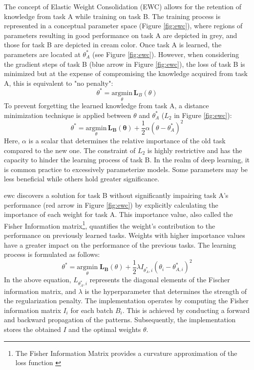 The concept of Elastic Weight Consolidation (EWC) allows for the retention of knowledge from task A while training on task B. The training process is represented in a conceptual parameter space (Figure \ref{fig:ewc}), where regions of parameters resulting in good performance on task A are depicted in grey, and those for task B are depicted in cream color. Once task A is learned, the parameters are located at $\theta_{A}^{*}$ (see Figure \ref{fig:ewc}). However, when considering the gradient steps of task B (blue arrow in Figure \ref{fig:ewc}), the loss of task B is minimized but at the expense of compromising the knowledge acquired from task A, this is equivalent to "no penalty": \[ \theta^* = \underset{\theta}{\mathrm{argmin}} \, \mathbf{L}_B(\theta) \] To prevent forgetting the learned knowledge from task A, a distance minimization technique is applied between $\theta$ and $\theta^{*}_{A}$ ($L_{2}$ in Figure \ref{fig:ewc}): \[ \theta^{*} = \underset{\theta}{\mathrm{argmin}} \, \mathbf{L_B(\theta)} + \frac{1}{2} \alpha ( \theta - \theta_{A}^{*} )^{2} \] Here, $\alpha$ is a scalar that determines the relative importance of the old task compared to the new one. 
The constraint of $L_{2}$ is highly restrictive and has the capacity to hinder the learning process of task B. In the realm of deep learning, it is common practice to excessively parameterize models. Some parameters may be less beneficial while others hold greater significance.

\acrshort{ewc} discovers a solution for task B without significantly impairing task A's performance (red arrow in Figure \ref{fig:ewc}) by explicitly calculating the importance of each weight for task A. This importance value, also called the Fisher Information matrix\footnote{The Fisher Information Matrix provides a curvature approximation of the loss function \citep{ly2017tutorial}}, quantifies the weight's contribution to the performance on previously learned tasks. Weights with higher importance values have a greater impact on the performance of the previous tasks. The learning process is formulated as follows: 
\[
\theta^{*} = \underset{\theta}{\mathrm{argmin}} \; \mathbf{L_B}(\theta) + \frac{1}{2} \lambda I_{\theta_{A}^{*},i}(\theta_{i} - \theta_{A,i}^{*})^{2}
\]
In the above equation, $L_{\theta_{A}^{*},i}$ represents the diagonal elements of the Fischer information matrix, and $\lambda$ is the hyperparameter that determines the strength of the regularization penalty.
The implementation operates by computing the Fisher information matrix $I_{i}$ for each batch $B_{i}$. This is achieved by conducting a forward and backward propagation of the patterns. Subsequently, the implementation stores the obtained $I$ and the optimal weights $\theta$.


